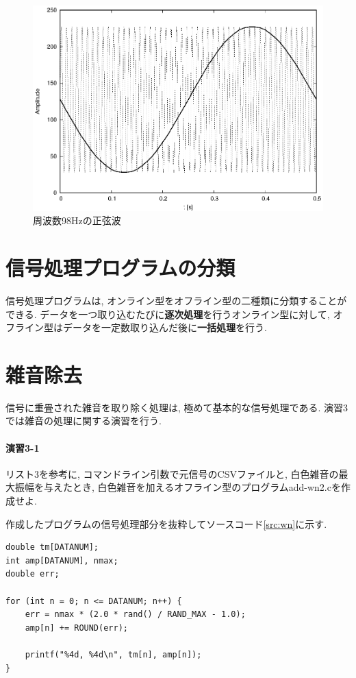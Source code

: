 \documentclass[titlepage]{jsarticle}
\begin{document}
        \begin{figure}[ht]
            \centering
            \includegraphics[width=12cm]{images/sin98.eps}
            \caption{周波数98Hzの正弦波}
            \label{fig:sin98}
        \end{figure}

\section{信号処理プログラムの分類}
    信号処理プログラムは, オンライン型をオフライン型の二種類に分類することができる.
    データを一つ取り込むたびに\textbf{逐次処理}を行うオンライン型に対して,
    オフライン型はデータを一定数取り込んだ後に\textbf{一括処理}を行う.

\section{雑音除去}
    信号に重畳された雑音を取り除く処理は, 極めて基本的な信号処理である.
    演習3では雑音の処理に関する演習を行う.

    \paragraph{演習3-1} リスト3を参考に, コマンドライン引数で元信号のCSVファイルと,
    白色雑音の最大振幅を与えたとき, 白色雑音を加えるオフライン型のプログラムadd-wn2.cを作成せよ.

        作成したプログラムの信号処理部分を抜粋してソースコード\ref{src:wn}に示す.

        \begin{lstlisting}[caption=add-wn2.c, label=src:wn]
double tm[DATANUM];
int amp[DATANUM], nmax;
double err;

for (int n = 0; n <= DATANUM; n++) {
    err = nmax * (2.0 * rand() / RAND_MAX - 1.0);
    amp[n] += ROUND(err);

    printf("%4d, %4d\n", tm[n], amp[n]);
}\end{lstlisting}
\end{document}
